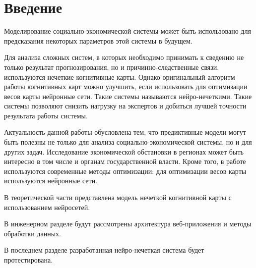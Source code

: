 \chapter*{Введение}
\label{sec:afterwords}

Моделирование социально-экономической системы может быть использовано для предсказания
некоторых параметров этой системы в будущем.

Для анализа сложных систем, в которых необходимо принимать к сведению не только результат прогнозирования, но и причинно-следственные связи, используются нечеткие когнитивные карты. Однако оригинальный алгоритм работы когнитивных карт можно улучшить, если использовать для оптимизации весов карты нейронные сети. Такие системы называются нейро-нечеткими. Такие системы позволяют снизить нагрузку на экспертов и добиться лучшей точности результата работы системы.

Актуальность данной работы обусловлена тем, что предиктивные модели
могут быть полезны не только для анализа социально-экономической системы, но и для других задач.
Исследование экономической обстановки в регионах может быть интересно в том числе и органам государственной власти.
Кроме того, в работе используются современные методы оптимизации: для оптимизации весов карты используются нейронные сети.

В теоретической части представлена модель нечеткой когнитивной карты с использованием
нейросетей.

В инженерном разделе будут рассмотрены архитектура веб-приложения и методы обработки данных.

В последнем разделе разработанная нейро-нечеткая система будет протестирована.